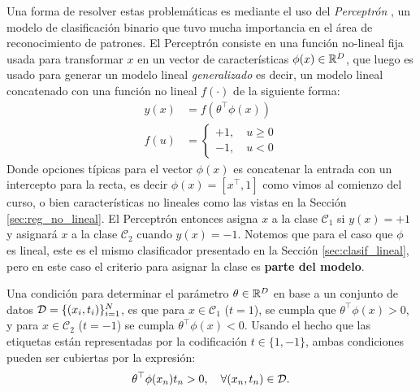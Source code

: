 Una forma de resolver estas problemáticas es mediante el uso del \emph{Perceptrón} \cite{rosenblatt_1958}, un modelo de clasificación binario que tuvo mucha importancia en el área de reconocimiento de patrones. El Perceptrón consiste en una función no-lineal fija usada para transformar $x$ en un vector de características $\phi(x)\in{\mathbb R}^D$, que luego es usado para generar un modelo lineal \emph{generalizado} es decir, un modelo lineal concatenado con una función no lineal $f(\cdot)$ de la siguiente forma:
\begin{align}
	y(x) &= f(\theta^\top\phi(x))\\
	f(u) &= \left\{\begin{matrix}
	+1,\quad u\geq 0\\
	-1,\quad u<0
	\end{matrix}\right.
\end{align}
Donde opciones típicas para el vector $\phi(x)$ es concatenar la entrada con un intercepto para la recta, es decir $\phi(x) = [x^\top, 1]$ como vimos al comienzo del curso, o bien características no lineales como las vistas en la Sección \ref{sec:reg_no_lineal}. El Perceptrón entonces asigna $x$ a la clase $\mathcal{C}_1$ si $y(x)=+1$ y asignará $x$ a la clase $\mathcal{C}_2$ cuando $y(x)=-1$. Notemos que  para  el caso que $\phi$ es lineal, este es el mismo clasificador presentado en la Sección \ref{sec:clasif_lineal}, pero en este caso el criterio para asignar la clase es \textbf{parte del modelo}.

Una condición para determinar el parámetro $\theta\in{\mathbb R}^D$ en base a un conjunto de datos  ${\mathcal D} = \{(x_i,t_i)\}_{i=1}^N$, es que para $x\in\mathcal{C}_1$ ($t=1$), se cumpla que $\theta^\top\phi(x) > 0$, y para $x\in\mathcal{C}_2$ ($t=-1$) se cumpla $\theta^\top \phi(x) < 0$. Usando el hecho que las etiquetas están representadas por la  codificación $t\in\{1,-1\}$, ambas condiciones pueden ser cubiertas por la expresión:
\begin{equation}
	\theta^\top\phi(x_n)t_n > 0,\quad \forall (x_n,t_n) \in {\mathcal D}.
\end{equation}

